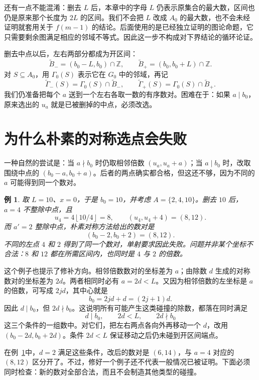 \documentclass[UTF8,a4paper,oneside,openany,fontset=fandol,zihao=-4]{ctexbook}
\theoremstyle{guide}
\newtheorem{example}[theorem]{例}
\newcommand{\Z}{\mathbb Z}
\newcommand{\floor}[1]{\left\lfloor#1\right\rfloor}
\begin{document}
还有一点不能混淆：删去 $L$ 后，本章中的字母 $L$ 仍表示原集合的最大数，区间也仍是原来那个长度为 $2L$ 的区间。我们不会把 $L$ 改成 $A_0$ 的最大数，也不会未经证明就套用关于 $f(m-1)$ 的结论。后面使用的是已经独立证明的图论命题，它只需要剩余图满足相应的邻域不等式。因此这一步不构成对下界结论的循环论证。

删去中点以后，左右两部分都成为开区间：
\[
  \widetilde B_-=(b_0-L,b_0)\cap\Z,\qquad
  \widetilde B_+=(b_0,b_0+L)\cap\Z.
\]
对 $S\subseteq A_0$，用 $\Gamma_0(S)$ 表示它在 $G_0$ 中的邻域，再记
\[
  \widetilde\Gamma_-(S)=\Gamma_0(S)\cap\widetilde B_-,\qquad
  \widetilde\Gamma_+(S)=\Gamma_0(S)\cap\widetilde B_+.
\]
我们仍准备把每个 $a$ 送到一个左右各取一数的有序数对。困难在于：如果 $a\mid b_0$，原来选出的 $u_a$ 就是已被删掉的中点，必须改选。

\section{为什么朴素的对称选点会失败}

一种自然的尝试是：当 $a\nmid b_0$ 时仍取相邻倍数 $(u_a,u_a+a)$；当 $a\mid b_0$ 时，改取围绕中点的 $(b_0-a,b_0+a)$。后者的两点确实都合格，但这还不够，因为不同的 $a$ 可能得到同一个数对。

\begin{example}\label{low:naive-collision}
取 $L=10$、$x=0$，于是 $b_0=10$，并考虑 $A=\{2,4,10\}$。删去 $10$ 后，$a=4$ 不整除中点，且
\[
  u_4=4\floor{10/4}=8,
  \qquad (u_4,u_4+4)=(8,12).
\]
而 $a'=2$ 整除中点，朴素对称方法给出的数对是
\[
  (b_0-2,b_0+2)=(8,12).
\]
不同的左点 $4$ 和 $2$ 得到了同一个数对，单射要求因此失败。问题并非某个坐标不合法：$8$ 和 $12$ 都在所需区间内，也同时是 $4$ 与 $2$ 的倍数。
\end{example}

这个例子也提示了修补方向。相邻倍数数对的坐标差为 $a$；由除数 $d$ 生成的对称数对的坐标差为 $2d$。两者相同时必有 $a=2d<L$。又因为相邻倍数的左坐标是 $a$ 的倍数，可写成 $2jd$，其中心就是
\[
  b_0=2jd+d=(2j+1)d.
\]
因此 $d\mid b_0$，但 $2d\nmid b_0$。这说明所有可能产生这类碰撞的除数，都落在同时满足
\[
  d\mid b_0,\qquad 2d<L,\qquad 2d\nmid b_0
\]
这三个条件的一组数中。对它们，把左右两点各向外再移动一个 $d$，改用 $(b_0-2d,b_0+2d)$。条件 $2d<L$ 保证移动之后仍未碰到开区间端点。

在例~\ref{low:naive-collision}中，$d=2$ 满足这些条件，改后的数对是 $(6,14)$，与 $a=4$ 对应的 $(8,12)$ 区分开了。不过，修好一个例子还不代表一般情况已被证明。下面必须同时检查：新的数对全部合法，而且不会制造其他类型的碰撞。
\end{document}

